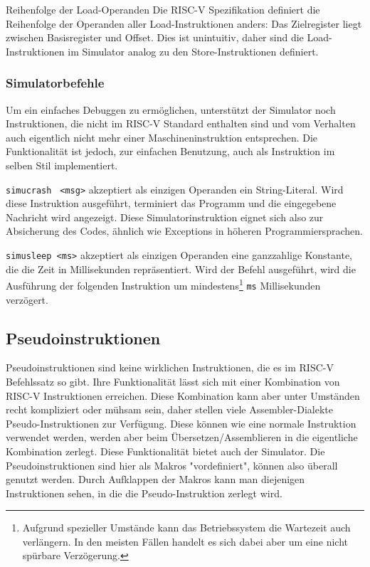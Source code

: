 \begin{infoblock}{Reihenfolge der Load-Operanden}
Die RISC-V Spezifikation definiert die Reihenfolge der Operanden aller
Load-Instruktionen anders: Das Zielregister liegt zwischen Basisregister und
Offset. Dies ist unintuitiv, daher sind die Load-Instruktionen im Simulator
analog zu den Store-Instruktionen definiert.
\end{infoblock}

\subsubsection{Simulatorbefehle}

Um ein einfaches Debuggen zu ermöglichen, unterstützt der Simulator noch
Instruktionen, die nicht im RISC-V Standard enthalten sind und vom Verhalten
auch eigentlich nicht mehr einer Maschineninstruktion entsprechen. Die
Funktionalität ist jedoch, zur einfachen Benutzung, auch als Instruktion im
selben Stil implementiert.

\texttt{simucrash } \texttt{<msg>} akzeptiert als einzigen Operanden ein
String-Literal. Wird diese Instruktion ausgeführt, terminiert das Programm und
die eingegebene Nachricht wird angezeigt. Diese Simulatorinstruktion eignet sich
also zur Absicherung des Codes, ähnlich wie Exceptions in höheren
Programmiersprachen.

\texttt{simusleep }\texttt{<ms>} akzeptiert als einzigen Operanden eine
ganzzahlige Konstante, die die Zeit in Millisekunden repräsentiert. Wird der
Befehl ausgeführt, wird die Ausführung der folgenden Instruktion um
mindestens\footnote{Aufgrund spezieller Umstände kann das Betriebssystem die
Wartezeit auch verlängern. In den meisten Fällen handelt es sich dabei aber
um eine nicht spürbare Verzögerung.} \texttt{ms} Millisekunden verzögert.


\subsection{Pseudoinstruktionen}
\label{user-manual-riscv-overview-pseudos}

Pseudoinstruktionen sind keine wirklichen Instruktionen, die es im RISC-V
Befehlssatz so gibt. Ihre Funktionalität lässt sich mit einer Kombination von
RISC-V Instruktionen erreichen. Diese Kombination kann aber unter Umständen
recht kompliziert oder mühsam sein, daher stellen viele Assembler-Dialekte
Pseudo-Instruktionen zur Verfügung. Diese können wie eine normale Instruktion
verwendet werden, werden aber beim Übersetzen/Assemblieren in die eigentliche
Kombination zerlegt. Diese Funktionalität bietet auch der Simulator. Die
Pseudoinstruktionen sind hier als Makros "vordefiniert", können also überall
genutzt werden. Durch Aufklappen der Makros kann man diejenigen Instruktionen
sehen, in die die Pseudo-Instruktion zerlegt wird.

